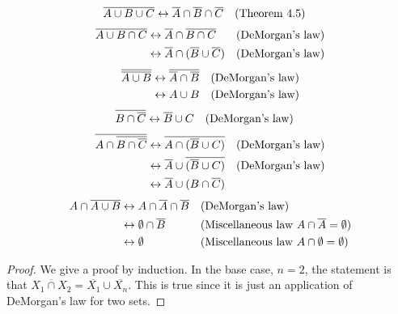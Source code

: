 \begin{solutions}
	\solution\spart\begin{align*}
	\overline{A\cup B\cup C}&\leftrightarrow \overline{A}\cap\overline{B}\cap\overline{C}&&\text{(Theorem 4.5)}
	\end{align*}
	\spart\begin{align*}
	\overline{A\cup B\cap C}&\leftrightarrow\overline{A}\cap\overline{B\cap C}&&\text{(DeMorgan's law)}\\
	&\leftrightarrow\overline{A}\cap(\overline{B}\cup\overline{C})&&\text{(DeMorgan's law)}
	\end{align*}
	\spart\begin{align*}
	\overline{\overline{A\cup B}}&\leftrightarrow\overline{\overline{A}\cap\overline{B}}&&\text{(DeMorgan's law)}\\
	&\leftrightarrow A\cup B&&\text{(DeMorgan's law)}
	\end{align*}
	\spart\begin{align*}
	\overline{B\cap\overline{C}}&\leftrightarrow\overline{B}\cup C&&\text{(DeMorgan's law)}
	\end{align*}
	\spart\begin{align*}
	\overline{A\cap\overline{B\cap\overline{C}}}&\leftrightarrow\overline{A\cap(\overline{B}\cup C)}&&\text{(DeMorgan's law)}\\
	&\leftrightarrow\overline{A}\cup \overline{(\overline{B}\cup C)}&&\text{(DeMorgan's law)}\\
	&\leftrightarrow\overline{A}\cup (B\cap\overline{C})
	\end{align*}
	\spart\begin{align*}
	A\cap\overline{A\cup B}&\leftrightarrow A\cap\overline{A}\cap\overline{B}&&\text{(DeMorgan's law)}\\
	&\leftrightarrow \emptyset\cap\overline{B}&&\text{(Miscellaneous law $A\cap\overline{A}=\emptyset$)}\\
	&\leftrightarrow\emptyset&&\text{(Miscellaneous law $A\cap\emptyset = \emptyset$)}
	\end{align*}

	\solution\begin{proof}
		We give a proof by induction.  In the base case, $n=2$, the
		statement is that $\overline{X_1\cap X_2}=\overline{X_1}\cup\overline{X_n}$.
		This is true since it is just an application of DeMorgan's law for two sets.


\end{proof}
\end{solutions}
